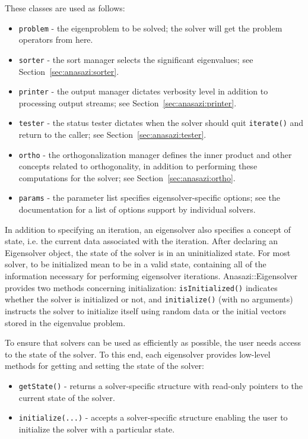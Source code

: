 These classes are used as follows:
\begin{itemize}
  \item \verb!problem! - the eigenproblem to be solved; the solver will
    get the problem operators from here.
  \item \verb!sorter! - the sort manager selects the significant eigenvalues; see
    Section~\ref{sec:anasazi:sorter}.
  \item \verb!printer! - the output manager dictates verbosity level in addition to 
    processing output streams; see Section~\ref{sec:anasazi:printer}.
  \item \verb!tester! - the status tester dictates when the solver should quit
    \verb!iterate()! and return to the caller; see Section~\ref{sec:anasazi:tester}.
  \item \verb!ortho! - the orthogonalization manager defines the inner product and other
    concepts related to 
    orthogonality, in addition to performing these computations for the solver; see
    Section~\ref{sec:anasazi:ortho}.
  \item \verb!params! - the parameter list specifies eigensolver-specific options; see the
    documentation for a list of options support by individual solvers.
\end{itemize}

In addition to specifying an iteration, an eigensolver also specifies a concept of state,
i.e. the current data associated with the iteration. After declaring an Eigensolver
object, the state of the solver is in an uninitialized state. For most solver, to be
initialized mean to be in a valid state, containing all of the information necessary for
performing eigensolver iterations. Anasazi::Eigensolver provides two methods concerning
initialization: \verb!isInitialized()! indicates whether the solver is initialized or not,
and \verb!initialize()! (with no arguments) instructs the solver to initialize itself
using random data or the initial vectors stored in the eigenvalue problem.

To ensure that solvers can be used as efficiently as possible, 
the user needs access to the state of the
solver. To this end, each eigensolver provides low-level methods for getting and setting the
state of the solver:
\begin{itemize}
  \item \verb!getState()! - returns a solver-specific structure with read-only pointers to
    the current state of the solver.
  \item \verb!initialize(...)! - accepts a solver-specific structure enabling the user to
    initialize the solver with a particular state.
\end{itemize}

